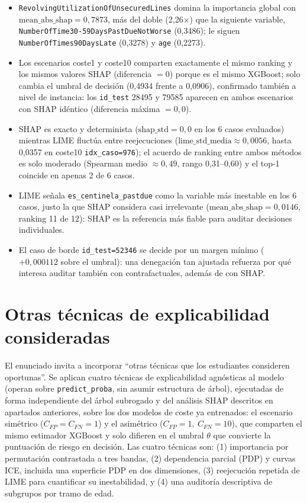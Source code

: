 \documentclass[11pt,a4paper]{article}
\begin{document}
\begin{itemize}
\item \texttt{RevolvingUtilizationOfUnsecuredLines} domina la importancia global con $\text{mean\_abs\_shap}=0{,}7873$, más del doble (2,26$\times$) que la siguiente variable, \texttt{NumberOfTime30-59DaysPastDueNotWorse} (0,3486); le siguen \texttt{NumberOfTimes90DaysLate} (0,3278) y \texttt{age} (0,2273).
\item Los escenarios coste1 y coste10 comparten exactamente el mismo ranking y los mismos valores SHAP (diferencia $=0$) porque es el mismo XGBoost; solo cambia el umbral de decisión (0,4934 frente a 0,0906), confirmado también a nivel de instancia: los \texttt{id\_test} 28495 y 79585 aparecen en ambos escenarios con SHAP idéntico (diferencia máxima $=0{,}0$).
\item SHAP es exacto y determinista ($\text{shap\_std}=0{,}0$ en los 6 casos evaluados) mientras LIME fluctúa entre reejecuciones ($\text{lime\_std\_media}\approx 0{,}0056$, hasta 0,0357 en coste10 \texttt{idx\_caso=976}); el acuerdo de ranking entre ambos métodos es solo moderado (Spearman medio $\approx 0{,}49$, rango 0,31--0,60) y el top-1 coincide en apenas 2 de 6 casos.
\item LIME señala \texttt{es\_centinela\_pastdue} como la variable más inestable en los 6 casos, justo la que SHAP considera casi irrelevante ($\text{mean\_abs\_shap}=0{,}0146$, ranking 11 de 12): SHAP es la referencia más fiable para auditar decisiones individuales.
\item El caso de borde \texttt{id\_test=52346} se decide por un margen mínimo ($+0{,}000112$ sobre el umbral): una denegación tan ajustada refuerza por qué interesa auditar también con contrafactuales, además de con SHAP.
\end{itemize}


\section{Otras técnicas de explicabilidad consideradas}

El enunciado invita a incorporar ``otras técnicas que los estudiantes consideren oportunas''. Se aplican
cuatro técnicas de explicabilidad agnósticas al modelo (operan sobre \texttt{predict\_proba}, sin asumir
estructura de árbol), ejecutadas de forma independiente del árbol subrogado y del análisis SHAP descritos
en apartados anteriores, sobre los dos modelos de coste ya entrenados: el escenario simétrico
($C_{FP}=C_{FN}=1$) y el asimétrico ($C_{FP}=1,\ C_{FN}=10$), que comparten el mismo estimador XGBoost y
solo difieren en el umbral $\theta$ que convierte la puntuación de riesgo en decisión. Las cuatro técnicas
son: (1) importancia por permutación contrastada a tres bandas, (2) dependencia parcial (PDP) y curvas ICE,
incluida una superficie PDP en dos dimensiones, (3) reejecución repetida de LIME para cuantificar su
inestabilidad, y (4) una auditoría descriptiva de subgrupos por tramo de edad.
\end{document}
